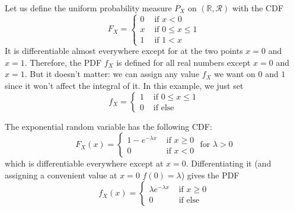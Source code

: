 \documentclass{article}
\begin{document}
      \begin{example}
        Let us define the uniform probability measure $P_X$ on $(\mathbb{R}, \mathcal{R})$ with the CDF 
        \begin{equation}
          F_X = \begin{cases} 0 & \text{ if } x < 0 \\
          x & \text{ if } 0 \leq x \leq 1 \\
          1 & \text{ if } 1 < x \end{cases}
        \end{equation}
        It is differentiable almost everywhere except for at the two points $x = 0$ and $x = 1$. Therefore, the PDF $f_X$ is defined for all real numbers except $x = 0$ and $x = 1$. But it doesn't matter: we can assign any value $f_X$ we want on $0$ and $1$ since it won't affect the integral of it. In this example, we just set 
        \begin{equation}
          f_X = \begin{cases} 1 & \text{ if } 0 \leq x \leq 1 \\
          0 & \text{ if else} \end{cases} 
        \end{equation}
      \end{example}

      \begin{example}
        The exponential random variable has the following CDF: 
        \begin{equation}
          F_X (x) = \begin{cases} 1 - e^{-\lambda x} & \text{ if } x \geq 0 \\ 0 & \text{ if } x < 0 \end{cases} \text{ for } \lambda > 0
        \end{equation}
        which is differentiable everywhere except at $x = 0$. Differentiating it (and assigning a convenient value at $x = 0$ $f(0) = \lambda$) gives the PDF 
        \begin{equation}
          f_X (x) = \begin{cases} \lambda e^{-\lambda x} & \text{ if } x \geq 0 \\ 0 & \text{ if else} \end{cases}
        \end{equation}
      \end{example}
\end{document}
